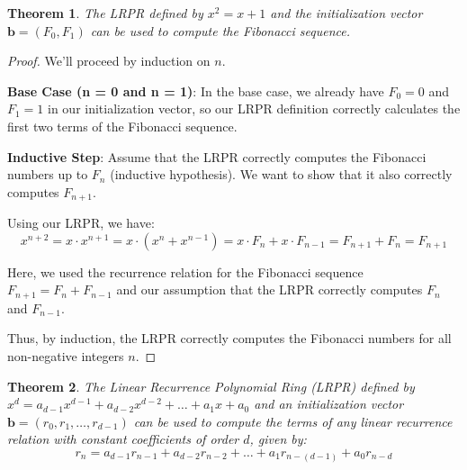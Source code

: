 \documentclass{article}
\theoremstyle{plain}
\newtheorem{thm}{Theorem}
\begin{document}
\begin{thm}
\label{thm:1}
The LRPR defined by \( x^2 = x + 1 \) and the initialization vector \( \mathbf{b} = (F_0, F_1) \) can be used to compute the Fibonacci sequence.
\end{thm}
\begin{proof}
We'll proceed by induction on \( n \).

\textbf{Base Case (n = 0 and n = 1)}:
In the base case, we already have \( F_0 = 0 \) and \( F_1 = 1 \) in our initialization vector, so our LRPR definition correctly calculates the first two terms of the Fibonacci sequence.

\textbf{Inductive Step}:
Assume that the LRPR correctly computes the Fibonacci numbers up to \( F_n \) (inductive hypothesis). We want to show that it also correctly computes \( F_{n+1} \).

Using our LRPR, we have:
\[ x^{n+2} = x \cdot x^{n+1} = x \cdot (x^n + x^{n-1}) = x \cdot F_n + x \cdot F_{n-1} = F_{n+1} + F_n = F_{n+1} \]

Here, we used the recurrence relation for the Fibonacci sequence \( F_{n+1} = F_n + F_{n-1} \) and our assumption that the LRPR correctly computes \( F_n \) and \( F_{n-1} \).

Thus, by induction, the LRPR correctly computes the Fibonacci numbers for all non-negative integers \( n \).
\end{proof}

\begin{thm}
\label{thm:2}
The Linear Recurrence Polynomial Ring (LRPR) defined by \(x^d = a_{d-1}x^{d-1} + a_{d-2}x^{d-2} + \ldots + a_1x + a_0\) and an initialization vector \( \mathbf{b} = (r_0, r_1, \ldots, r_{d-1}) \) can be used to compute the terms of any linear recurrence relation with constant coefficients of order \(d\), given by:
\[ r_n = a_{d-1}r_{n-1} + a_{d-2}r_{n-2} + \ldots + a_1r_{n-(d-1)} + a_0r_{n-d} \]
\end{thm}
\end{document}
